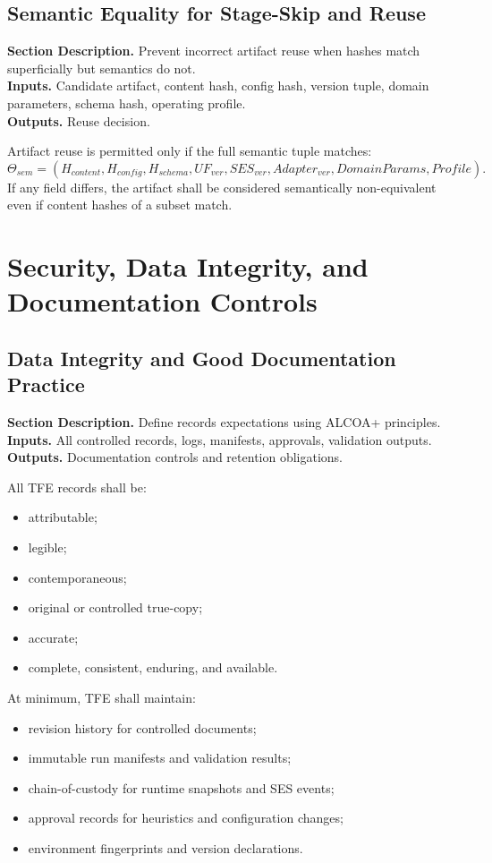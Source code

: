 \documentclass[11pt]{report}
\newcommand{\meta}[3]{\textbf{Section Description.} #1\\
\textbf{Inputs.} #2\\
\textbf{Outputs.} #3\par}
\begin{document}
\section{Semantic Equality for Stage-Skip and Reuse}
\meta{Prevent incorrect artifact reuse when hashes match superficially but semantics do not.}{Candidate artifact, content hash, config hash, version tuple, domain parameters, schema hash, operating profile.}{Reuse decision.}

Artifact reuse is permitted only if the full semantic tuple matches:
\[
\Theta_{sem}=(H_{content},H_{config},H_{schema},UF_{ver},SES_{ver},Adapter_{ver},DomainParams,Profile).
\]
If any field differs, the artifact shall be considered semantically non-equivalent even if content hashes of a subset match.

\chapter{Security, Data Integrity, and Documentation Controls}
\section{Data Integrity and Good Documentation Practice}
\meta{Define records expectations using ALCOA+ principles.}{All controlled records, logs, manifests, approvals, validation outputs.}{Documentation controls and retention obligations.}

All TFE records shall be:
\begin{itemize}
    \item attributable;
    \item legible;
    \item contemporaneous;
    \item original or controlled true-copy;
    \item accurate;
    \item complete, consistent, enduring, and available.
\end{itemize}

At minimum, TFE shall maintain:
\begin{itemize}
    \item revision history for controlled documents;
    \item immutable run manifests and validation results;
    \item chain-of-custody for runtime snapshots and SES events;
    \item approval records for heuristics and configuration changes;
    \item environment fingerprints and version declarations.
\end{itemize}
\end{document}
